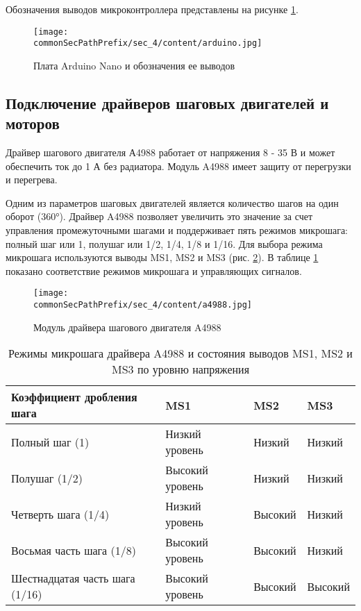 Обозначения выводов микроконтроллера\cite{arduino_sheet} представлены на рисунке \ref{fig:arduino}.
\begin{figure}[ht]
    \centering
    \texttt{[image: \\commonSecPathPrefix/sec\_4/content/arduino.jpg]}
    \caption{Плата Arduino Nano и обозначения ее выводов}
    \label{fig:arduino}
\end{figure}

\subsection{Подключение драйверов шаговых двигателей и моторов}

Драйвер шагового двигателя А4988 работает от напряжения 8 - 35 В и может обеспечить ток до 1 А без радиатора\cite{a4988_sheet}. 
Модуль A4988 имеет защиту от перегрузки и перегрева. 


Одним из параметров шаговых двигателей является количество шагов на один оборот (360°). 
Драйвер A4988 позволяет увеличить это значение за счет управления промежуточными шагами и поддерживает пять режимов микрошага\cite{a4988_sheet}: 
полный шаг или 1, полушаг или 1/2, 1/4, 1/8 и 1/16. Для выбора режима микрошага используются выводы MS1, MS2 и MS3 (рис. \ref{fig:a4988}). 
В таблице \ref{tab:microstepping} показано соответствие режимов микрошага и управляющих сигналов.

\begin{figure}[ht]
    \centering
    \texttt{[image: \\commonSecPathPrefix/sec\_4/content/a4988.jpg]}
    \caption{Модуль драйвера шагового двигателя A4988}
    \label{fig:a4988}
\end{figure}

\begin{table}[ht]
    \caption{Режимы микрошага драйвера A4988 и состояния выводов MS1, MS2 и MS3 по уровню напряжения}
    \centering
    \begin{tabular}{|l|l|l|l|}
        \hline
        Коэффициент дробления шага & MS1 & MS2 & MS3 \\
        \hline
        Полный шаг (1) & Низкий уровень& Низкий & Низкий \\
        \hline
        Полушаг (1/2) & Высокий уровень& Низкий & Низкий \\
        \hline
        Четверть шага (1/4) & Низкий уровень& Высокий & Низкий \\
        \hline
        Восьмая часть шага (1/8) & Высокий уровень& Высокий & Низкий \\
        \hline
        Шестнадцатая часть шага (1/16) & Высокий уровень& Высокий & Высокий \\
        \hline
    \end{tabular}
    \label{tab:microstepping}
\end{table}

